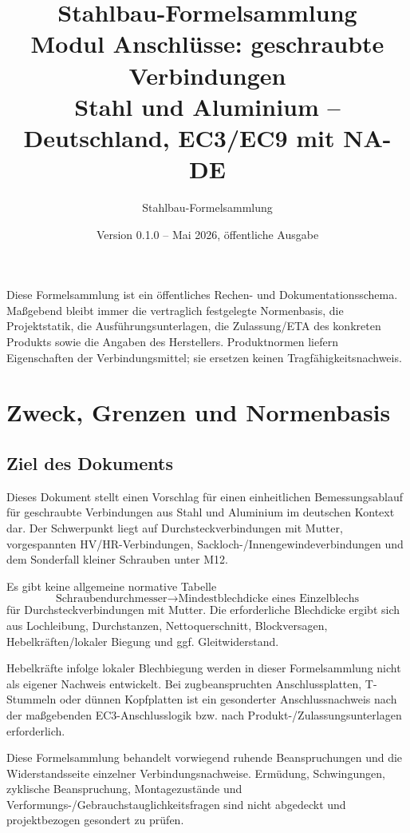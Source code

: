 \documentclass[10pt,a4paper]{article}
\title{\sffamily\bfseries\color{primaryblue}Stahlbau-Formelsammlung\\[2mm]
\large Modul Anschlüsse: geschraubte Verbindungen\\[1mm]
\normalsize Stahl und Aluminium -- Deutschland, EC3/EC9 mit NA-DE}
\author{Stahlbau-Formelsammlung}
\date{Version 0.1.0 -- Mai 2026, öffentliche Ausgabe}
\begin{document}
\maketitle
\thispagestyle{fancy}

\begin{normbox}
Diese Formelsammlung ist ein öffentliches Rechen- und Dokumentationsschema. Maßgebend bleibt immer die vertraglich festgelegte Normenbasis, die Projektstatik, die Ausführungsunterlagen, die Zulassung/ETA des konkreten Produkts sowie die Angaben des Herstellers. Produktnormen liefern Eigenschaften der Verbindungsmittel; sie ersetzen keinen Tragfähigkeitsnachweis.
\end{normbox}

\tableofcontents
\newpage

\section{Zweck, Grenzen und Normenbasis}

\subsection{Ziel des Dokuments}
Dieses Dokument stellt einen Vorschlag für einen einheitlichen Bemessungsablauf für geschraubte Verbindungen aus Stahl und Aluminium im deutschen Kontext dar. Der Schwerpunkt liegt auf Durchsteckverbindungen mit Mutter, vorgespannten HV/HR-Verbindungen, Sackloch-/Innengewindeverbindungen und dem Sonderfall kleiner Schrauben unter M12.

\begin{hinweisbox}
Es gibt keine allgemeine normative Tabelle
\[
\text{Schraubendurchmesser} \rightarrow \text{Mindestblechdicke eines Einzelblechs}
\]
für Durchsteckverbindungen mit Mutter. Die erforderliche Blechdicke ergibt sich aus Lochleibung, Durchstanzen, Nettoquerschnitt, Blockversagen, Hebelkräften/lokaler Biegung und ggf. Gleitwiderstand.

Hebelkräfte infolge lokaler Blechbiegung werden in dieser Formelsammlung nicht als eigener Nachweis entwickelt. Bei zugbeanspruchten Anschlussplatten, T-Stummeln oder dünnen Kopfplatten ist ein gesonderter Anschlussnachweis nach der maßgebenden EC3-Anschlusslogik bzw. nach Produkt-/Zulassungsunterlagen erforderlich.
\end{hinweisbox}

\begin{warnbox}
Diese Formelsammlung behandelt vorwiegend ruhende Beanspruchungen und die Widerstandsseite einzelner Verbindungsnachweise. Ermüdung, Schwingungen, zyklische Beanspruchung, Montagezustände und Verformungs-/Gebrauchstauglichkeitsfragen sind nicht abgedeckt und projektbezogen gesondert zu prüfen.
\end{warnbox}
\end{document}
